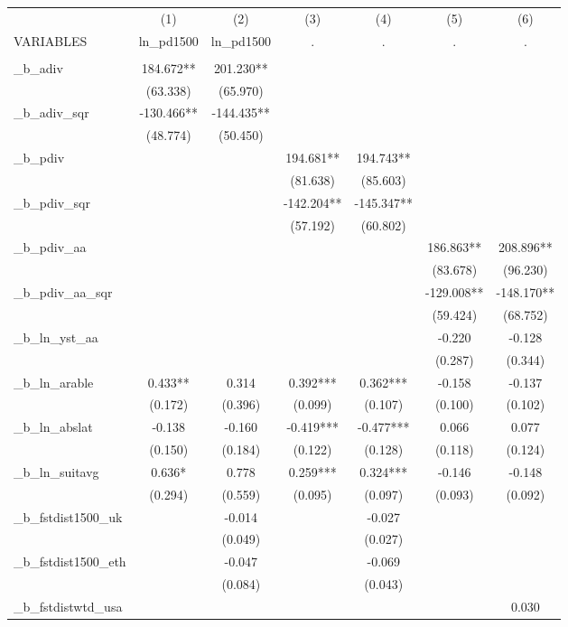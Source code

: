 \documentclass[]{article}
\begin{document}
\begin{tabular}{lcccccc} \hline
 & (1) & (2) & (3) & (4) & (5) & (6) \\
VARIABLES & ln\_pd1500 & ln\_pd1500 & . & . & . & . \\ \hline
 &  &  &  &  &  &  \\
\_b\_adiv & 184.672** & 201.230** &  &  &  &  \\
 & (63.338) & (65.970) &  &  &  &  \\
\_b\_adiv\_sqr & -130.466** & -144.435** &  &  &  &  \\
 & (48.774) & (50.450) &  &  &  &  \\
\_b\_pdiv &  &  & 194.681** & 194.743** &  &  \\
 &  &  & (81.638) & (85.603) &  &  \\
\_b\_pdiv\_sqr &  &  & -142.204** & -145.347** &  &  \\
 &  &  & (57.192) & (60.802) &  &  \\
\_b\_pdiv\_aa &  &  &  &  & 186.863** & 208.896** \\
 &  &  &  &  & (83.678) & (96.230) \\
\_b\_pdiv\_aa\_sqr &  &  &  &  & -129.008** & -148.170** \\
 &  &  &  &  & (59.424) & (68.752) \\
\_b\_ln\_yst\_aa &  &  &  &  & -0.220 & -0.128 \\
 &  &  &  &  & (0.287) & (0.344) \\
\_b\_ln\_arable & 0.433** & 0.314 & 0.392*** & 0.362*** & -0.158 & -0.137 \\
 & (0.172) & (0.396) & (0.099) & (0.107) & (0.100) & (0.102) \\
\_b\_ln\_abslat & -0.138 & -0.160 & -0.419*** & -0.477*** & 0.066 & 0.077 \\
 & (0.150) & (0.184) & (0.122) & (0.128) & (0.118) & (0.124) \\
\_b\_ln\_suitavg & 0.636* & 0.778 & 0.259*** & 0.324*** & -0.146 & -0.148 \\
 & (0.294) & (0.559) & (0.095) & (0.097) & (0.093) & (0.092) \\
\_b\_fstdist1500\_uk &  & -0.014 &  & -0.027 &  &  \\
 &  & (0.049) &  & (0.027) &  &  \\
\_b\_fstdist1500\_eth &  & -0.047 &  & -0.069 &  &  \\
 &  & (0.084) &  & (0.043) &  &  \\
\_b\_fstdistwtd\_usa &  &  &  &  &  & 0.030 \\

\end{tabular}
\end{document}
